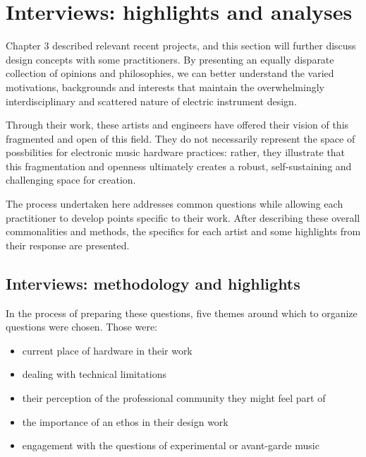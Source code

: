 \chapter{Interviews: highlights and analyses}\label{interviews}
Chapter 3 described relevant recent projects, and this section will further discuss design concepts with some practitioners. By presenting an equally disparate collection of opinions and philosophies, we can better understand the varied motivations, backgrounds and interests that maintain the overwhelmingly interdisciplinary and scattered nature of electric instrument design. 

Through their work, these artists and engineers have offered their vision of this fragmented and open of this field. They do not necessarily represent the space of possbilities for electronic music hardware practices: rather, they illustrate that this fragmentation and openness ultimately creates a robust, self-sustaining and challenging space for creation. 

The process undertaken here addresses common questions while allowing each practitioner to develop points specific to their work. After describing these overall commonalities and methods, the specifics for each artist and some highlights from their response are presented. 

\section{Interviews: methodology and highlights}

In the process of preparing these questions, five themes around which to organize questions were chosen. Those were: 

\begin{itemize}
	\item current place of hardware in their work 
	\item dealing with technical limitations
	\item their perception of the professional community they might feel part of
	\item the importance of an ethos in their design work
	\item engagement with the questions of experimental or avant-garde music 
	\end{itemize}

